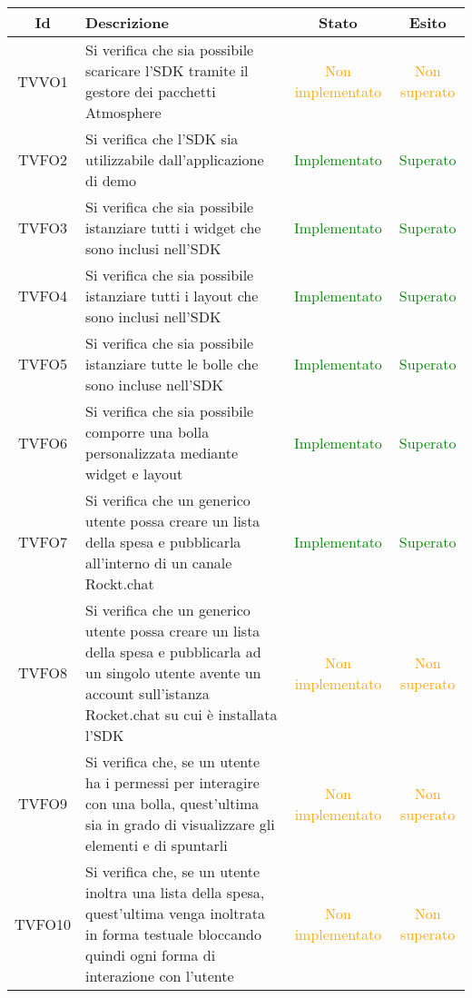 \begin{center}
	\begin{longtable}{|c|>{\centering}m{10cm}|c|c|}\hline
		Id & Descrizione & Stato & Esito\\ \hline
		TVVO1 & Si verifica che sia possibile scaricare l'SDK tramite il gestore dei pacchetti Atmosphere & \textcolor{Orange}{Non implementato} & \textcolor{Orange}{Non superato} \\ \hline
		TVFO2 & Si verifica che l'SDK sia utilizzabile dall'applicazione di demo & \textcolor{Green}{Implementato} & \textcolor{Green}{Superato} \\ \hline
		TVFO3 & Si verifica che sia possibile istanziare tutti i widget che sono inclusi nell'SDK & \textcolor{Green}{Implementato} & \textcolor{Green}{Superato} \\ \hline
		TVFO4 & Si verifica che sia possibile istanziare tutti i layout che sono inclusi nell'SDK & \textcolor{Green}{Implementato} & \textcolor{Green}{Superato} \\ \hline
		TVFO5 & Si verifica che sia possibile istanziare tutte le bolle che sono incluse nell'SDK & \textcolor{Green}{Implementato} & \textcolor{Green}{Superato} \\ \hline
		TVFO6 & Si verifica che sia possibile comporre una bolla personalizzata mediante widget e layout & \textcolor{Green}{Implementato} & \textcolor{Green}{Superato} \\ \hline
		TVFO7 & Si verifica che un generico utente possa creare un lista della spesa e pubblicarla all'interno di un canale Rockt.chat & \textcolor{Green}{Implementato} & \textcolor{Green}{Superato} \\ \hline
		TVFO8 & Si verifica che un generico utente possa creare un lista della spesa e pubblicarla ad un singolo utente avente un account sull'istanza Rocket.chat su cui è installata l'SDK & \textcolor{Orange}{Non implementato} & \textcolor{Orange}{Non superato} \\ \hline
		TVFO9 & Si verifica che, se un utente ha i permessi per interagire con una bolla, quest'ultima sia in grado di visualizzare gli elementi e di spuntarli & \textcolor{Orange}{Non implementato} & \textcolor{Orange}{Non superato} \\ \hline
		TVFO10 & Si verifica che, se un utente inoltra una lista della spesa, quest'ultima venga inoltrata in forma testuale bloccando quindi ogni forma di interazione con l'utente & \textcolor{Orange}{Non implementato} & \textcolor{Orange}{Non superato} \\ \hline

\end{longtable}
\end{center}
